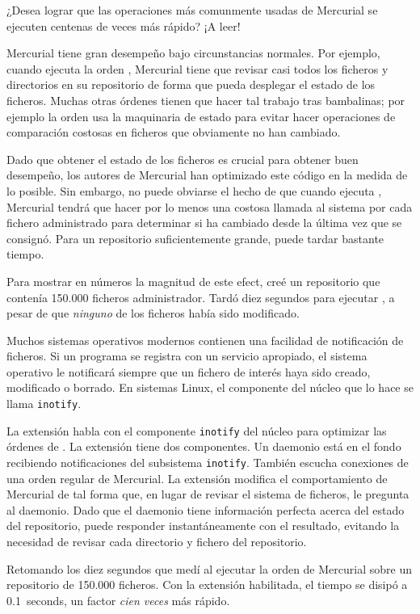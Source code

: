 ¿Desea lograr que las operaciones más comunmente usadas de Mercurial se
ejecuten centenas de veces más rápido? ¡A leer!

Mercurial tiene gran desempeño bajo circunstancias normales.  Por
ejemplo, cuando ejecuta la orden , Mercurial tiene que
revisar casi todos los ficheros y directorios en su repositorio de
forma que pueda desplegar el estado de los ficheros.  Muchas otras
órdenes tienen que hacer tal trabajo tras bambalinas;  por ejemplo la
orden  usa la maquinaria de estado para evitar hacer
operaciones de comparación costosas en ficheros que obviamente no han
cambiado.

Dado que obtener el estado de los ficheros es crucial para obtener
buen desempeño, los autores de Mercurial han optimizado este código en
la medida de lo posible.  Sin embargo, no puede obviarse el hecho de
que cuando ejecuta , Mercurial tendrá que hacer por lo
menos una costosa llamada al sistema por cada fichero administrado
para determinar si ha cambiado desde la última vez que se consignó.
Para un repositorio suficientemente grande, puede tardar bastante
tiempo.

Para mostrar en números la magnitud de este efect, creé un repositorio
que contenía 150.000 ficheros administrador.  Tardó diez segundos para
ejecutar , a pesar de que \emph{ninguno} de los ficheros
había sido modificado.

Muchos sistemas operativos modernos contienen una facilidad de
notificación de ficheros.  Si un programa se registra con un servicio
apropiado, el sistema operativo le notificará siempre que un fichero
de interés haya sido creado, modificado o borrado.  En sistemas Linux,
el componente del núcleo que lo hace se llama \texttt{inotify}.

La extensión  habla con el componente \texttt{inotify}
del núcleo para optimizar las órdenes de .  La extensión
tiene dos componentes.  Un daemonio está en el fondo recibiendo
notificaciones del subsistema \texttt{inotify}.  También escucha
conexiones de una orden regular de Mercurial.  La extensión modifica
el comportamiento de Mercurial de tal forma que, en lugar de revisar
el sistema de ficheros, le pregunta al daemonio.  Dado que el daemonio
tiene información perfecta acerca del estado del repositorio, puede
responder instantáneamente con el resultado, evitando la necesidad de
revisar cada directorio y fichero del repositorio.

Retomando los diez segundos que medí al ejecutar la orden
 de Mercurial sobre un repositorio de 150.000
ficheros. Con la extensión  habilitada, el tiempo se
disipó a 0.1~seconds, un factor \emph{cien veces} más rápido.

